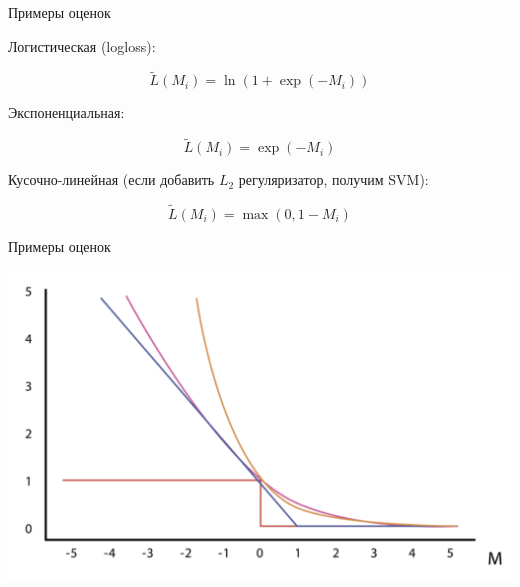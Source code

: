 \documentclass[notes,12pt, aspectratio=169]{beamer}
\newenvironment{wideitemize}{\itemize\addtolength{\itemsep}{10pt}}{\enditemize}
\begin{document}
\begin{frame}{Примеры оценок}
	\begin{wideitemize}
		\item  Логистическая (logloss): 
		
		\[
		\tilde L(M_i) = \ln(1 + \exp(-M_i))
		\]
		
		\item Экспоненциальная: 
		
		\[
		\tilde L(M_i) =  \exp(-M_i)
		\]
		
		\item Кусочно-линейная (если добавить $L_2$ регуляризатор, получим SVM): 
		
		\[
		\tilde L(M_i) =  \max(0, 1 - M_i)
		\]		
	\end{wideitemize}
\end{frame}


\begin{frame}{Примеры оценок}
	\begin{center}
		\includegraphics[width=.8\linewidth]{clfloss.png}
	\end{center}
\end{frame} 
\end{document}
